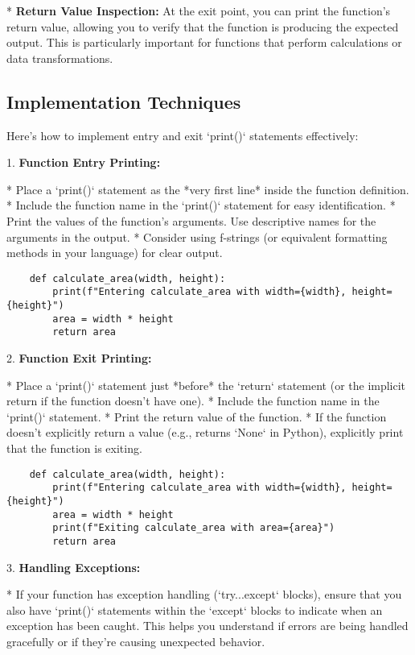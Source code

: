 \documentclass{article}
\begin{document}
*   \textbf{Return Value Inspection:} At the exit point, you can print the function's return value, allowing you to verify that the function is producing the expected output. This is particularly important for functions that perform calculations or data transformations.

\subsection*{Implementation Techniques}

Here's how to implement entry and exit `print()` statements effectively:

1.  \textbf{Function Entry Printing:}

    *   Place a `print()` statement as the *very first line* inside the function definition.
    *   Include the function name in the `print()` statement for easy identification.
    *   Print the values of the function's arguments. Use descriptive names for the arguments in the output.
    *   Consider using f-strings (or equivalent formatting methods in your language) for clear output.

    \begin{verbatim}
    def calculate_area(width, height):
        print(f"Entering calculate_area with width={width}, height={height}")
        area = width * height
        return area
    \end{verbatim}

2.  \textbf{Function Exit Printing:}

    *   Place a `print()` statement just *before* the `return` statement (or the implicit return if the function doesn't have one).
    *   Include the function name in the `print()` statement.
    *   Print the return value of the function.
    *   If the function doesn't explicitly return a value (e.g., returns `None` in Python), explicitly print that the function is exiting.

    \begin{verbatim}
    def calculate_area(width, height):
        print(f"Entering calculate_area with width={width}, height={height}")
        area = width * height
        print(f"Exiting calculate_area with area={area}")
        return area
    \end{verbatim}

3.  \textbf{Handling Exceptions:}

    *   If your function has exception handling (`try...except` blocks), ensure that you also have `print()` statements within the `except` blocks to indicate when an exception has been caught. This helps you understand if errors are being handled gracefully or if they're causing unexpected behavior.
\end{document}
